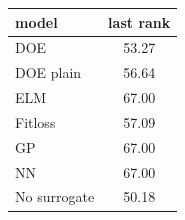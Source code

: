 \begin{tabular}{|lc|}
\hline
model & last rank\\
\hline
DOE & 53.27 \\
DOE plain & 56.64 \\
ELM & 67.00 \\
Fitloss & 57.09 \\
GP & 67.00 \\
NN & 67.00 \\
No surrogate & 50.18 \\
\hline
\end{tabular}
